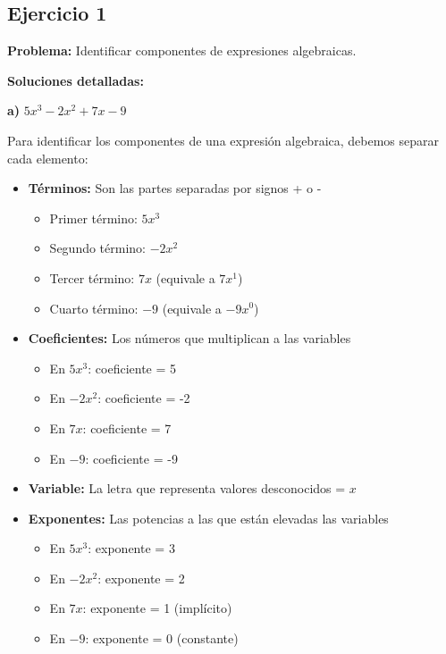 
\subsection*{Ejercicio 1}

\textbf{Problema:} Identificar componentes de expresiones algebraicas.

\textbf{Soluciones detalladas:}

\textbf{a)} $5x^3 - 2x^2 + 7x - 9$

Para identificar los componentes de una expresión algebraica, debemos separar cada elemento:

\begin{itemize}
    \item \textbf{Términos:} Son las partes separadas por signos + o -
    \begin{itemize}
        \item Primer término: $5x^3$
        \item Segundo término: $-2x^2$ 
        \item Tercer término: $7x$ (equivale a $7x^1$)
        \item Cuarto término: $-9$ (equivale a $-9x^0$)
    \end{itemize}
    
    \item \textbf{Coeficientes:} Los números que multiplican a las variables
    \begin{itemize}
        \item En $5x^3$: coeficiente = 5
        \item En $-2x^2$: coeficiente = -2
        \item En $7x$: coeficiente = 7
        \item En $-9$: coeficiente = -9
    \end{itemize}
    
    \item \textbf{Variable:} La letra que representa valores desconocidos = $x$
    
    \item \textbf{Exponentes:} Las potencias a las que están elevadas las variables
    \begin{itemize}
        \item En $5x^3$: exponente = 3
        \item En $-2x^2$: exponente = 2  
        \item En $7x$: exponente = 1 (implícito)
        \item En $-9$: exponente = 0 (constante)
    \end{itemize}
\end{itemize}

